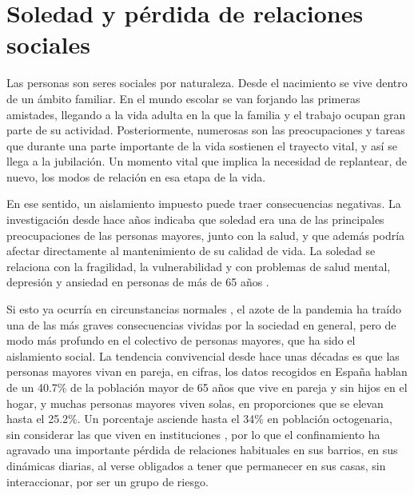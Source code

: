 \documentclass[spanish]{textolivre}
\begin{document}
\section{Soledad y pérdida de relaciones sociales}
Las personas son seres sociales por naturaleza. Desde el nacimiento se vive dentro de un ámbito familiar. En el mundo escolar se van forjando las primeras amistades, llegando a la vida adulta en la que la familia y el trabajo ocupan gran parte de su actividad. Posteriormente, numerosas son las preocupaciones y tareas que durante una parte importante de la vida sostienen el trayecto vital, y así se llega a la jubilación. Un momento vital que implica la necesidad de replantear, de nuevo, los modos de relación en esa etapa de la vida.

En ese sentido, un aislamiento impuesto puede traer consecuencias negativas. La investigación desde hace años indicaba que soledad era una de las principales preocupaciones de las personas mayores, junto con la salud, y que además podría afectar directamente al mantenimiento de su calidad de vida. La soledad se relaciona con la fragilidad, la vulnerabilidad y con problemas de salud mental, depresión y ansiedad en personas de más de 65 años \cite{etxeberria2020}. %

Si esto ya ocurría en circunstancias normales \cite{pochintesta2019}, %
el azote de la pandemia ha traído una de las más graves consecuencias vividas por la sociedad en general, pero de modo más profundo en el colectivo de personas mayores, que ha sido el aislamiento social. La tendencia convivencial desde hace unas décadas es que las personas mayores vivan en pareja, en cifras, los datos recogidos en España hablan de un 40.7\% de la población mayor de 65 años que  vive en pareja y sin hijos en el hogar, y muchas personas mayores viven solas, en proporciones que se elevan hasta el 25.2\%. Un porcentaje asciende hasta el 34\% en población octogenaria, sin considerar las que viven en instituciones \cite{ine2014}, %
por lo que el confinamiento ha agravado una importante pérdida de relaciones habituales en sus barrios, en sus dinámicas diarias, al verse obligados a tener que permanecer en sus casas, sin interaccionar, por ser un grupo de riesgo.
\end{document}
